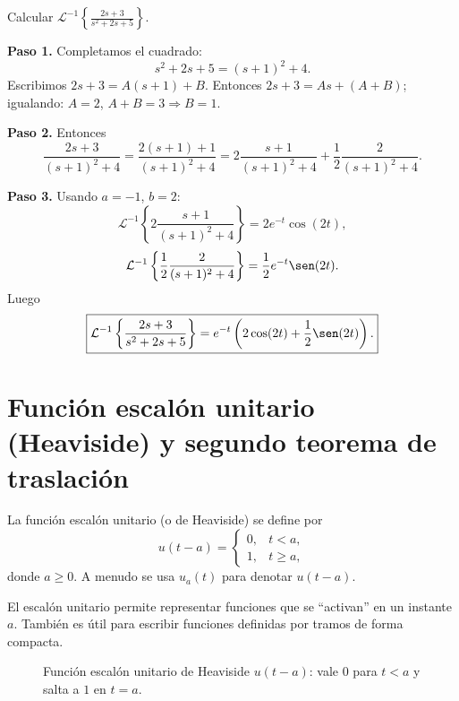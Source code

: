 \begin{example}
Calcular $\mathcal{L}^{-1}\left\{\frac{2s+3}{s^2+2s+5}\right\}$.
\begin{myproof}
\textbf{Paso 1.} Completamos el cuadrado:
\[
s^2+2s+5 = (s+1)^2 + 4.
\]
Escribimos $2s+3 = A(s+1)+B$. Entonces $2s+3 = A s + (A+B)$; igualando: $A=2$, $A+B=3 \Rightarrow B=1$.

\textbf{Paso 2.} Entonces
\[
\frac{2s+3}{(s+1)^2+4} = \frac{2(s+1)+1}{(s+1)^2+4} = 2\frac{s+1}{(s+1)^2+4} + \frac{1}{2}\frac{2}{(s+1)^2+4}.
\]

\textbf{Paso 3.} Usando $a=-1$, $b=2$:
\[
\mathcal{L}^{-1}\left\{2\frac{s+1}{(s+1)^2+4}\right\} = 2e^{-t}\cos(2t),
\]
\[
\mathcal{L}^{-1}\left\{\frac{1}{2}\frac{2}{(s+1)^2+4}\right\} = \frac{1}{2}e^{-t}\sen(2t).
\]
Luego
\[
\boxed{\mathcal{L}^{-1}\left\{\frac{2s+3}{s^2+2s+5}\right\} = e^{-t}\left(2\cos(2t) + \frac{1}{2}\sen(2t)\right).}
\]
\end{myproof}
\end{example}

\section{Función escalón unitario (Heaviside) y segundo teorema de traslación}

\begin{definition}
La función escalón unitario (o de Heaviside) se define por
\[
u(t-a) = 
\begin{cases}
0, & t<a,\\
1, & t\ge a,
\end{cases}
\]
donde $a\ge0$. A menudo se usa $u_a(t)$ para denotar $u(t-a)$.
\end{definition}

\begin{rem}
El escalón unitario permite representar funciones que se ``activan'' en un instante $a$. También es útil para escribir funciones definidas por tramos de forma compacta.
\end{rem}

\begin{figure}[!htbp]
\centering
{}
\caption{Función escalón unitario de Heaviside $u(t-a)$: vale $0$ para $t<a$ y salta a $1$ en $t=a$.}
\label{fig:heaviside}
\end{figure}

